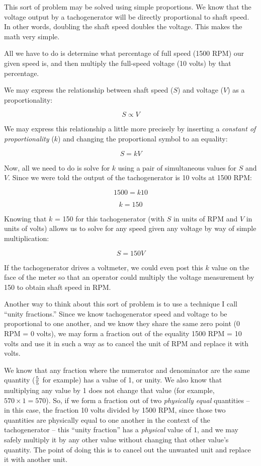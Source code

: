 





This sort of problem may be solved using simple proportions.  We know that the voltage output by a tachogenerator will be directly proportional to shaft speed.  In other words, doubling the shaft speed doubles the voltage.  This makes the math very simple.

All we have to do is determine what percentage of full speed (1500 RPM) our given speed is, and then multiply the full-speed voltage (10 volts) by that percentage.

We may express the relationship between shaft speed ($S$) and voltage ($V$) as a proportionality:

$$S \propto V$$

We may express this relationship a little more precisely by inserting a {\it constant of proportionality} ($k$) and changing the proportional symbol to an equality:

$$S = kV$$

Now, all we need to do is solve for $k$ using a pair of simultaneous values for $S$ and $V$.  Since we were told the output of the tachogenerator is 10 volts at 1500 RPM:

$$1500 = k 10$$

$$k = 150$$

Knowing that $k$ = 150 for this tachogenerator (with $S$ in units of RPM and $V$ in units of volts) allows us to solve for any speed given any voltage by way of simple multiplication:

$$S = 150 V$$

If the tachogenerator drives a voltmeter, we could even post this $k$ value on the face of the meter so that an operator could multiply the voltage measurement by 150 to obtain shaft speed in RPM.

\vskip 10pt

Another way to think about this sort of problem is to use a technique I call ``unity fractions.''  Since we know tachogenerator speed and voltage to be proportional to one another, and we know they share the same zero point (0 RPM = 0 volts), we may form a fraction out of the equality 1500 RPM = 10 volts and use it in such a way as to cancel the unit of RPM and replace it with volts.  

We know that any fraction where the numerator and denominator are the same quantity ($5 \over 5$ for example) has a value of 1, or unity.  We also know that multiplying any value by 1 does not change that value (for example, $570 \times 1 = 570$).  So, if we form a fraction out of two {\it physically equal} quantities -- in this case, the fraction 10 volts divided by 1500 RPM, since those two quantities are physically equal to one another in the context of the tachogenerator -- this ``unity fraction'' has a {\it physical} value of 1, and we may safely multiply it by any other value without changing that other value's quantity.  The point of doing this is to cancel out the unwanted unit and replace it with another unit.

